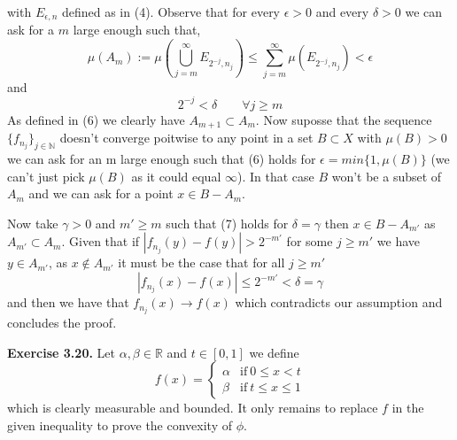 \documentclass{article}
\begin{document}
    with $E_{\epsilon,n}$ defined as in (4). Observe that for every $\epsilon > 0$ and every $\delta > 0$ we can ask for a $m$ large enough such that,
    \begin{equation}
        \mu \left( A_m \right) := \mu \left( \bigcup_{j = m}^{\infty} E_{2^{-j},n_j }\right) \le \sum_{j=m}^{\infty} \mu \left( E_{2^{-j},n_j} \right) < \epsilon 
    \end{equation}
    and
    \begin{equation}
        2^{-j} < \delta \qquad \forall j \ge m
    \end{equation}
    As defined in (6) we clearly have $A_{m+1} \subset A_m$. Now suposse that the sequence $\{f_{n_j}\}_{j \in \mathbb{N}}$ doesn't converge poitwise to any point in a set $B \subset X$ with $\mu \left( B \right) > 0$ we can ask for an m large enough such that (6) holds for $\epsilon = min\{1, \mu \left( B \right)\}$ (we can't just pick $\mu \left( B \right) $ as it could equal $\infty$). In that case $B$ won't be a subset of $A_m$ and we can ask for a point $x \in B - A_m$.

    Now take $\gamma > 0$ and $m' \ge m$ such that (7) holds for $\delta = \gamma$ then $x \in B-A_{m'}$  as $A_{m'} \subset A_m$. Given that if $|f_{n_j} \left( y \right) - f \left( y \right) | > 2^{-m'}$ for some $j \ge m'$ we have $ y \in A_{m'}$, as $x \notin A_{m'}$ it must be the case that for all $j \ge m'$
    \[
        |f_{n_j} \left( x \right) - f \left( x \right) | \le 2^{-m'} < \delta = \gamma
    \]
    and then we have that $f_{n_j} \left( x \right) \rightarrow f \left( x \right) $ which contradicts our assumption and concludes the proof.
\bigbreak

\begin{exercise}\textbf{Exercise 3.20.}
    Let $\alpha, \beta \in \mathbb{R}$ and $t \in [0,1]$ we define 
    \[
        f \left( x \right) =
        \begin{cases}
            \alpha & \text{if}\ 0 \le x < t \\
            \beta & \text{if}\ t \le x \le 1
        \end{cases}
    \]
    which is clearly measurable and bounded. It only remains to replace $f$ in the given inequality to prove the convexity of $\phi$.
\end{exercise}

\bigbreak
\end{document}
